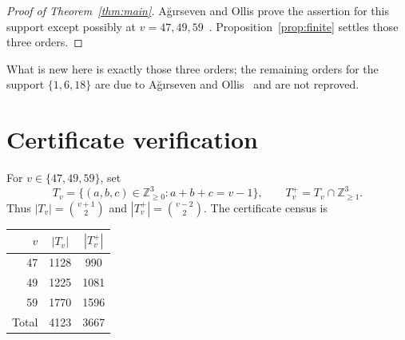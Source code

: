 \documentclass[11pt]{amsart}
\theoremstyle{remark}
\newcommand{\Z}{\mathbb Z}
\begin{document}
\begin{proof}[Proof of Theorem~\ref{thm:main}]
A\u{g}{\i}rseven and Ollis prove the assertion for this support except
possibly at $v=47,49,59$~\cite[Theorem~5.3]{AO}.  Proposition~\ref{prop:finite}
settles those three orders.
\end{proof}

What is new here is exactly those three orders; the remaining orders for the
support $\{1,6,18\}$ are due to A\u{g}{\i}rseven and
Ollis~\cite[Theorem~5.3]{AO} and are not reproved.

\section{Certificate verification}\label{sec:cert}

For $v\in\{47,49,59\}$, set
\[
  T_v=\{(a,b,c)\in\Z_{\ge0}^3:a+b+c=v-1\},
  \qquad
  T_v^+=T_v\cap\Z_{\ge1}^3.
\]
Thus $|T_v|=\binom{v+1}{2}$ and $|T_v^+|=\binom{v-2}{2}$.  The certificate
census is
\begin{center}
\begin{tabular}{@{}rcc@{}}
\toprule
$v$ & $|T_v|$ & $|T_v^+|$ \\
\midrule
47 & 1128 & 990 \\
49 & 1225 & 1081 \\
59 & 1770 & 1596 \\
\midrule
Total & 4123 & 3667 \\
\bottomrule
\end{tabular}
\end{center}
\end{document}
